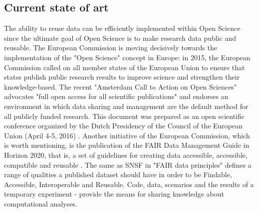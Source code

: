 \subsection{Current state of art}
The ability to reuse data can be efficiently implemented within Open Science since the ultimate goal of Open Science is to make research data public and reusable. The European Commission is moving decisively towards the implementation of the "Open Science" concept in Europe: in 2015, the European Commission called on all member states of the European Union to ensure that states publish public research results to improve science and strengthen their knowledge-based\cite{reus1}. The recent "Amsterdam Call to Action on Open Sciences" advocates "full open access for all scientific publications" and endorses an environment in which data sharing and management are the default method for all publicly funded research. This document was prepared as an open scientific conference organized by the Dutch Presidency of the Council of the European Union (April 4-5, 2016) \cite{reus2}. Another initiative of the European Commission, which is worth mentioning, is the publication of the FAIR Data Management Guide in Horizon 2020, that is, a set of guidelines for creating data accessible, accessible, compatible and reusable \cite{reus3}. The same as SNSF in "FAIR data principles"\cite{snsf} defines a range of qualities a published dataset should have in order to be Findable, Accessible, Interoperable and Reusable.
Code, data, scenarios and the results of a temporary experiment - provide the means for sharing knowledge about computational analyses.
